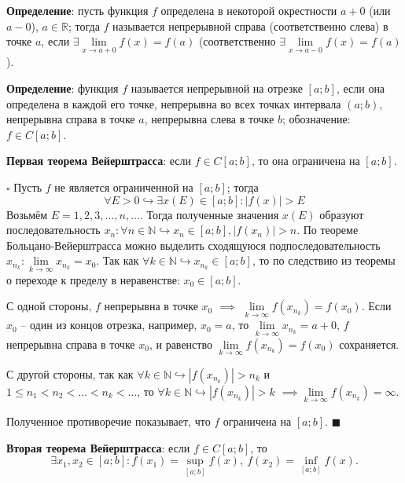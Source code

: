\documentclass[12pt, a4paper, reqno]{article}
\begin{document}
    \textbf{Определение}: пусть функция $f$ определена в некоторой окрестности $a + 0$ (или
    $a - 0$), $a\in\mathbb{R}$; тогда $f$ называется непрерывной справа (соответственно слева) в
    точке $a$, если $\exists\lim\limits_{x\to a + 0} f(x) = f(a)$ (соответственно
    $\exists\lim\limits_{x\to a - 0} f(x) = f(a)$).

    \textbf{Определение}: функция $f$ называется непрерывной на отрезке $[a; b]$, если она определена в
    каждой его точке, непрерывна во всех точках интервала $(a; b)$, непрерывна справа в точке $a$,
    непрерывна слева в точке $b$; обозначение: $f \in C[a; b]$.

    \textbf{Первая теорема Вейерштрасса}: если   $f \in C[a; b]$, то она ограничена на $[a; b]$.

    $\square$ Пусть $f$ не является ограниченной на $[a; b]$; тогда
    \begin{equation*}
        \forall E > 0\hookrightarrow \exists x(E)\in[a; b]: |f(x)| > E
    \end{equation*}
    Возьмём $E = 1, 2, 3, \ldots, n, \ldots$. Тогда полученные значения $x(E)$ образуют последовательность
    $x_n: \forall n\in\mathbb{N}\hookrightarrow x_n\in[a; b], |f(x_n)| > n$. По теореме
    Больцано-Вейерштрасса можно выделить сходящуюся подпоследовательность
    $x_{n_k}: \lim\limits_{k\to\infty} x_{n_k} = x_0$. Так как
    $\forall k\in\mathbb{N}\hookrightarrow x_{n_k}\in[a; b]$, то по следствию из теоремы о переходе
    к пределу в неравенстве: $x_0\in[a; b]$.

    С одной стороны, $f$ непрерывна в точке $x_0$ $\implies$ $\lim\limits_{k\to\infty} f(x_{n_k}) = f(x_0)$.
    Если $x_0$ -- один из концов отрезка, например, $x_0 = a$, то
    $\lim\limits_{k\to\infty} x_{n_k} = a + 0$, $f$ непрерывна справа в точке $x_0$, и равенство
    $\lim\limits_{k\to\infty} f(x_{n_k}) = f(x_0)$ сохраняется.

    С другой стороны, так как $\forall k\in\mathbb{N} \hookrightarrow|f(x_{n_k})| > n_k$ и
    $1\leq n_1 < n_2 < \ldots < n_k < \ldots$, то $\forall k\in\mathbb{N}\hookrightarrow
    |f(x_{n_k})| > k$ $\implies \lim\limits_{k\to\infty} f(x_{n_k}) = \infty$.

    Полученное противоречие показывает, что $f$ ограничена на $[a; b]$. $\blacksquare$

    \textbf{Вторая теорема Вейерштрасса}: если $f \in C[a; b]$, то
    \begin{equation*}
        \exists x_1, x_2\in[a; b]: f(x_1) = \sup\limits_{[a; b]} f(x),\ f(x_2) = \inf\limits_{[a; b]} f(x).
    \end{equation*}
\end{document}
